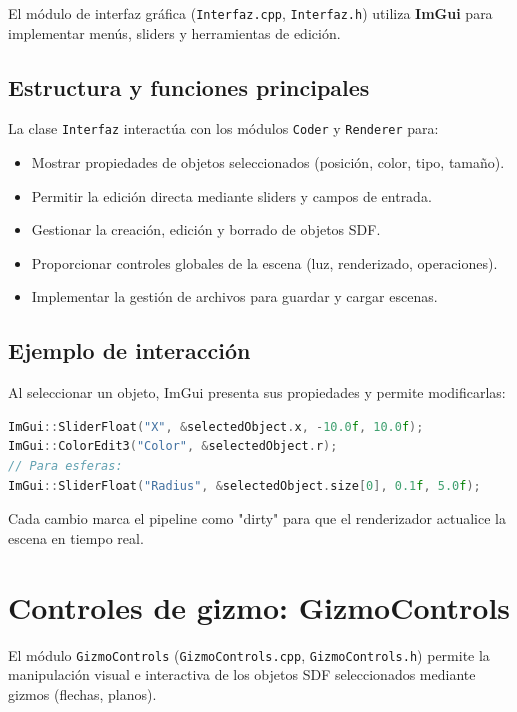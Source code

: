 El módulo de interfaz gráfica (\texttt{Interfaz.cpp}, \texttt{Interfaz.h})
utiliza \textbf{ImGui} para implementar menús, sliders y herramientas de
edición.

\subsection{Estructura y funciones principales}

La clase \texttt{Interfaz} interactúa con los módulos \texttt{Coder} y
\texttt{Renderer} para:
\begin{itemize}
    \item Mostrar propiedades de objetos seleccionados (posición, color, tipo, tamaño).
    \item Permitir la edición directa mediante sliders y campos de entrada.
    \item Gestionar la creación, edición y borrado de objetos SDF.
    \item Proporcionar controles globales de la escena (luz, renderizado, operaciones).
    \item Implementar la gestión de archivos para guardar y cargar escenas.
\end{itemize}

\subsection{Ejemplo de interacción}

Al seleccionar un objeto, ImGui presenta sus propiedades y permite
modificarlas:
\begin{lstlisting}[language=C++,caption={Edición de propiedades de un objeto SDF seleccionado}]
ImGui::SliderFloat("X", &selectedObject.x, -10.0f, 10.0f);
ImGui::ColorEdit3("Color", &selectedObject.r);
// Para esferas:
ImGui::SliderFloat("Radius", &selectedObject.size[0], 0.1f, 5.0f);
\end{lstlisting}
Cada cambio marca el pipeline como "dirty" para que el renderizador actualice
la escena en tiempo real.

\section{Controles de gizmo: GizmoControls}

El módulo \texttt{GizmoControls} (\texttt{GizmoControls.cpp},
\texttt{GizmoControls.h}) permite la manipulación visual e interactiva de los
objetos SDF seleccionados mediante gizmos (flechas, planos).

